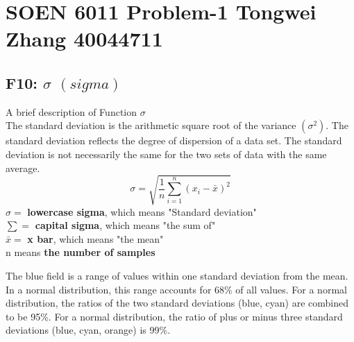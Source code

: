 \documentclass[12pt]{report}
\begin{document}
\section*{SOEN 6011 Problem-1 Tongwei Zhang  40044711}
\subsection*{F10: $\sigma$  $(sigma)$}
A brief description of Function $\sigma$ \\
The standard deviation is the arithmetic square root of the variance $(\sigma^2)$. The standard deviation reflects the degree of dispersion of a data set. The standard deviation is not necessarily the same for the two sets of data with the same average.
   $$\sigma=\sqrt{\frac{1}{n}{\sum_{i=1}^n(x_i-\bar{x})^2}}$$
$\sigma =$ \textbf{lowercase sigma}, which means "Standard deviation"\\
$\sum =$ \textbf{capital sigma}, which means "the sum of"\\
$\bar{x} =$ \textbf{x bar}, which means "the mean"\\
n means \textbf{the number of samples}\\
\begin{center}
\end{center}
The blue field is a range of values within one standard deviation from the mean. In a normal distribution, this range accounts for 68\% of all values. For a normal distribution, the ratios of the two standard deviations (blue, cyan) are combined to be 95\%. For a normal distribution, the ratio of plus or minus three standard deviations (blue, cyan, orange) is 99\%.\\
\end{document}
